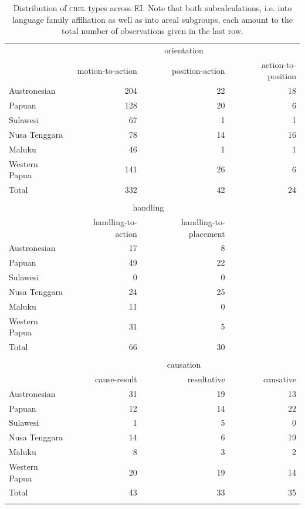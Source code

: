 \begin{table}
\begin{tabular}{lrrr}
  \lsptoprule
&\multicolumn{3}{c}{orientation}\\
 & {motion-to-action} & {position-action} & {action-to-position}\\  
  \hline
  Austronesian & 204 & 22 & 18\tabularnewline
  Papuan & 128 & 20 &  6\tabularnewline
   \hline
  Sulawesi & 67 & 1 & 1\tabularnewline
  Nusa Tenggara & 78 & 14 & 16\tabularnewline
  Maluku & 46 & 1 & 1\tabularnewline 
  Western Papua & 141 & 26 & 6 \tabularnewline 
\hline
Total & 332 & 42 & 24\tabularnewline
\hline
\\
  \hline
& \multicolumn{2}{c}{handling} &\\
& {handling-to-action} & {handling-to-placement}\\ 
  \hline
  Austronesian & 17 & 8 \tabularnewline
  Papuan &  49 & 22 \tabularnewline
   \hline
  Sulawesi & 0 & 0 \tabularnewline
  Nusa Tenggara & 24 & 25 \tabularnewline
  Maluku & 11 & 0 \tabularnewline 
  Western Papua & 31 & 5  \tabularnewline 
\hline
Total  & 66 & 30 \tabularnewline
\hline
\\
  \hline
&  \multicolumn{3}{c}{causation} \\
 & {cause-result} & {resultative} & {causative} \\  
  \hline
  Austronesian & 31 & 19 & 13 \tabularnewline
  Papuan & 12 & 14 & 22 \tabularnewline
   \hline
  Sulawesi & 1 & 5 & 0 \tabularnewline
  Nusa Tenggara & 14 & 6 & 19 \tabularnewline
  Maluku & 8 & 3 & 2 \tabularnewline 
  Western Papua & 20 & 19 & 14 \tabularnewline 
\hline
Total & 43 & 33 & 35 \tabularnewline
\lspbottomrule
\end{tabular}
\caption[Distribution of \textsc{srel} types across EI]{Distribution of \textsc{crel} types across EI. Note that both subcalculations, i.e. into language family affiliation as well as into areal subgroups, each amount to the total number of observations given in the last row.}
\label{table:SREL_overview}
\end{table}

